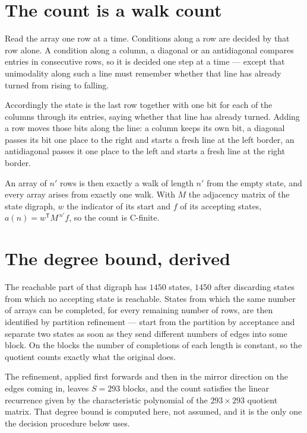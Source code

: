 \documentclass[11pt]{article}
\theoremstyle{definition}
\begin{document}
\section{The count is a walk count}

Read the array one row at a time. Conditions along a row are decided by that row alone. A condition along a column, a diagonal or an antidiagonal compares entries in consecutive rows, so it is decided one step at a time --- except that unimodality along such a line must remember whether that line has already turned from rising to falling.

Accordingly the state is the last row together with one bit for each of the columns through its entries, saying whether that line has already turned. Adding a row moves those bits along the line: a column keeps its own bit, a diagonal passes its bit one place to the right and starts a fresh line at the left border, an antidiagonal passes it one place to the left and starts a fresh line at the right border.

An array of $n'$ rows is then exactly a walk of length $n'$ from the empty state, and every array arises from exactly one walk. With $M$ the adjacency matrix of the state digraph, $w$ the indicator of its start and $f$ of its accepting states, $a(n) = w^{\mathsf T}M^{\,n'}f$, so the count is C-finite.

\section{The degree bound, derived}

The reachable part of that digraph has $1450$ states, $1450$ after discarding states from which no accepting state is reachable. States from which the same number of arrays can be completed, for every remaining number of rows, are then identified by partition refinement --- start from the partition by acceptance and separate two states as soon as they send different numbers of edges into some block. On the blocks the number of completions of each length is constant, so the quotient counts exactly what the original does.

The refinement, applied first forwards and then in the mirror direction on the edges coming in, leaves $S = 293$ blocks, and the count satisfies the linear recurrence given by the characteristic polynomial of the $293 \times 293$ quotient matrix. That degree bound is computed here, not assumed, and it is the only one the decision procedure below uses.
\end{document}
